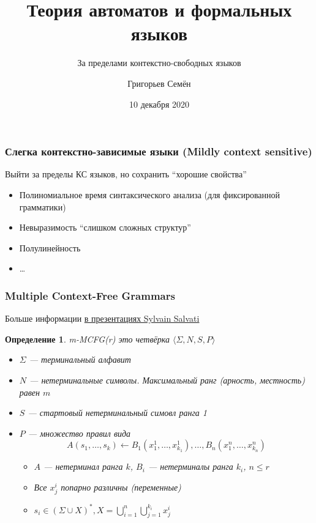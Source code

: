 \documentclass{beamer}
\title[]{Теория автоматов и формальных языков}
\subtitle[]{За пределами контекстно-свободных языков}
\institute[]{
Санкт-Петербургский государственный университет\\
}
\author[]{Григорьев Семён}
\date{10 декабря 2020}
\newtheorem{rudefinition}{Определение}
\begin{document}
{
  \begin{frame}
    \titlepage
  \end{frame}
}

\begin{frame}[fragile]
  \frametitle{Слегка контекстно-зависимые языки (Mildly context sensitive)}
   Выйти за пределы КС языков, но сохранить ``хорошие свойства''
   \begin{itemize}
    \item Полиномиальное время синтаксического анализа (для фиксированной грамматики)
    \item Невыразимость ``слишком сложных структур''
    \item Полулинейность
    \item \ldots
   \end{itemize}
\end{frame}


\begin{frame}[fragile]
  \frametitle{Multiple Context-Free Grammars}
  Больше информации \href{https://www.labri.fr/perso/salvati/downloads/cours/esslli/}{в презентациях Sylvain Salvati}
  \begin{rudefinition}
    \textit{m-MCFG(r)} это четвёрка $\langle \Sigma, N, S, P \rangle$
    \begin{itemize}
      \item $\Sigma$ --- терминальный алфавит
      \item $N$ --- нетерминальные символы. Максимальный ранг (арность, местность) равен $m$
      \item $S$ --- стартовый нетерминальный симовл ранга 1
      \item $P$ --- множество правил вида
      $$
      A(s_1,\ldots,s_k) \leftarrow B_1(x_1^1,\ldots,x_{k_1}^1), \ldots, B_n(x_1^n,\ldots,x_{k_n}^n)
      $$
      \begin{itemize}
        \item $A$ --- нетерминал ранга $k$, $B_i$ --- нетерминалы ранга $k_i$, $n \leq r$
        \item Все $x^i_j$ попарно различны (переменные)
        \item $s_i \in (\Sigma \cup X)^*, X = \bigcup_{i=1}^n \bigcup_{j=1}^{k_i} {x^i_j}$
      \end{itemize}
  \end{itemize}
  \end{rudefinition}
\end{frame}
\end{document}

